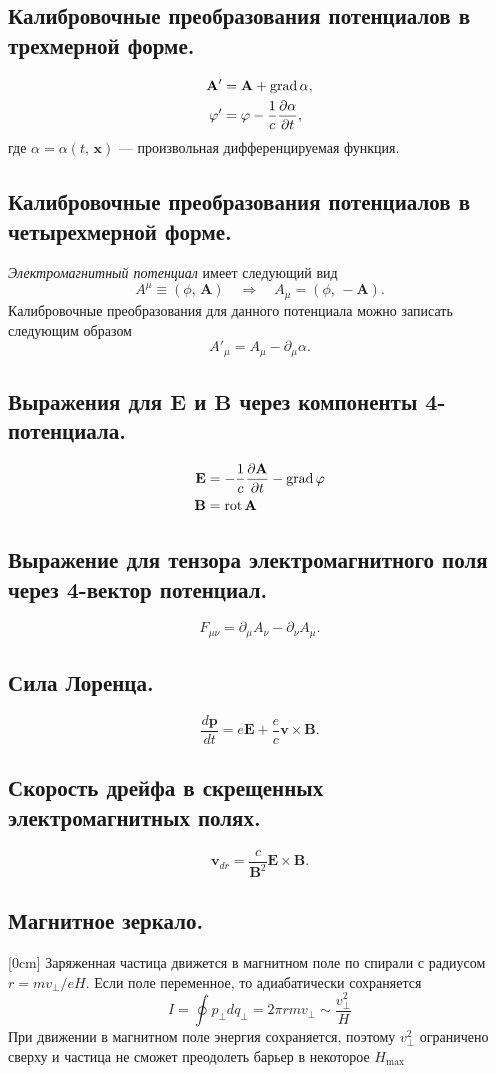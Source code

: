 \documentclass[a4paper,12pt]{article}
\begin{document}
\subsection{Калибровочные преобразования потенциалов в трехмерной форме.}
\begin{align*}
	\mathbf{A}'&=\mathbf{A}+\operatorname{grad} \alpha,\\
	\varphi'&=\varphi-\frac{1}{c}\frac{\partial \alpha}{\partial t} 
,\end{align*}
где $\alpha=\alpha(t,\,\mathbf{x})$ --- произвольная дифференцируемая функция.
\subsection{Калибровочные преобразования потенциалов в четырехмерной форме.}
\emph{Электромагнитный  потенциал} имеет следующий вид
\[
	A^\mu\equiv(\phi,\,\mathbf{A})\quad \Rightarrow\quad A_\mu=(\phi,\,-\mathbf{A})
.\]
Калибровочные преобразования для данного потенциала можно записать следующим
образом
\[
A'_\mu=A_\mu-\partial_\mu \alpha
.\] 
\subsection{Выражения для $\mathbf{E}$ и $\mathbf{B}$ через компоненты 4-потенциала.}
\begin{align*}
	\mathbf{E}&=-\frac{1}{c}\frac{\partial \mathbf{A}}{\partial t} -
	\operatorname{grad} \varphi\\
	\mathbf{B}&=\operatorname{rot} \mathbf{A}
\end{align*}
\subsection{Выражение для тензора электромагнитного поля через 4-вектор
потенциал.}
\[
F_{\mu\nu}=\partial_\mu A_\nu -\partial_\nu A_\mu
.\] 
\subsection{Сила Лоренца.}
\[
\frac{d\mathbf{p}}{dt}=e \mathbf{E}+\frac{e}{c}\mathbf{v} \times
\mathbf{B} 
.\] 
\subsection{Скорость дрейфа в скрещенных электромагнитных полях.}
\[
	\mathbf{v}_{dr}=\frac{c}{\mathbf{B}^2}\mathbf{E}\times\mathbf{B}
.\] 
\subsection{Магнитное зеркало.}
[0cm]
Заряженная частица движется в магнитном поле по спирали с радиусом
$r=mv_{\bot}/eH$. Если поле переменное, то адиабатически сохраняется 
\[I=\oint p_{\bot} dq_{\bot}=2\pi r m v_{\bot}\sim \frac{v_{\bot}^2}{H}\]
При движении в магнитном поле энергия сохраняется, поэтому $v_{\bot}^2$
ограничено сверху и частица не сможет преодолеть барьер в некоторое $H_{\max}$
\end{document}
